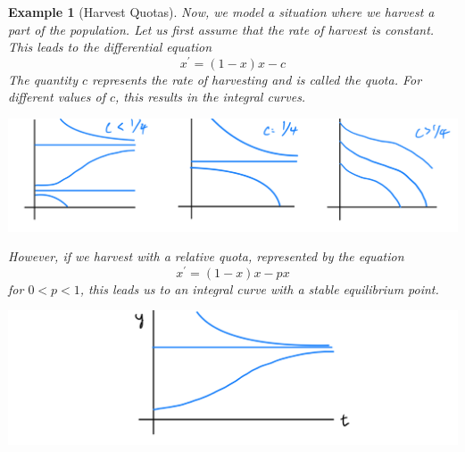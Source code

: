 \documentclass{article}
\newtheorem{example}{Example}[section]
\theoremstyle{remark}
\theoremstyle{definition}
\begin{document}
\begin{example}[Harvest Quotas]
Now, we model a situation where we harvest a part of the population. Let us first assume that the rate of harvest is constant. This leads to the differential equation
\[x^\prime = (1 - x) x - c\]
The quantity $c$ represents the rate of harvesting and is called the \textit{quota}. For different values of $c$, this results in the integral curves. 
\begin{center}
    \includegraphics[scale=0.2]{img/Harvest_Quotas.PNG}
\end{center}
However, if we harvest with a relative quota, represented by the equation
\[x^\prime = (1 - x) x - p x\]
for $0 < p < 1$, this leads us to an integral curve with a stable equilibrium point. 
\begin{center}
    \includegraphics[scale=0.2]{img/Relative_Quota.PNG}
\end{center}
\end{example}
\end{document}
